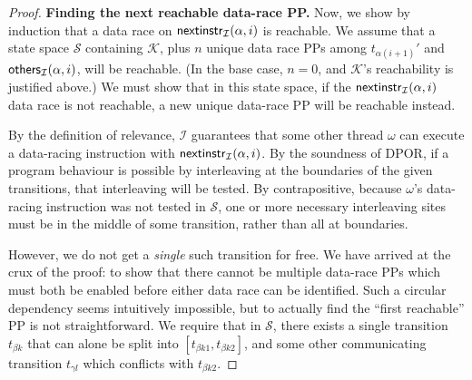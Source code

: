 \begin{proof}
\newcommand\tbk{\ensuremath{t_{\beta{}k}}}
\newcommand\tbka{\ensuremath{t_{\beta{}k1}}}
\newcommand\tbkb{\ensuremath{t_{\beta{}k2}}}
\newcommand\tgl{\ensuremath{t_{\gamma{}l}}}

{\bf Finding the next reachable data-race PP.}
Now, we show by induction that a data race on $\mathsf{nextinstr}_{\mathcal{I}}(\alpha,i)$ is reachable.
We assume that a state space $\mathcal{S}$ containing $\mathcal{K}$,
plus $n$ unique data race PPs among $t_{\alpha{}(i+1)}'$ and $\mathsf{others}_{\mathcal{I}}(\alpha,i)$,
will be reachable.
(In the base case, $n=0$, and $\mathcal{K}$'s reachability is justified above.)
We must show that in this state space, if the $\mathsf{nextinstr}_{\mathcal{I}}(\alpha,i)$ data race is not reachable,
a new unique data-race PP will be reachable instead.

By the definition of relevance, %
$\mathcal{I}$ guarantees that some other thread $\omega$ can execute a data-racing instruction with $\mathsf{nextinstr}_{\mathcal{I}}(\alpha,i)$.
%
By the soundness of DPOR, if a program behaviour is possible by interleaving at the boundaries of
the given transitions, that interleaving will be tested.
By contrapositive,
because $\omega$'s data-racing instruction was not tested in $\mathcal{S}$,
one or more necessary interleaving sites must be in the middle of some transition, rather than all at boundaries.

However, we do not get a {\em single} such transition for free.
We have arrived at the crux of the proof:
to show that there cannot be multiple data-race PPs which must both be enabled before either data race can be identified.
Such a circular dependency seems intuitively impossible, but to actually find the ``first reachable'' PP is not straightforward.
We require that in $\mathcal{S}$, there exists a single transition $\tbk$ that can alone be split into $[\tbka,\tbkb]$,
and some other communicating transition $\tgl$ which conflicts with $\tbkb$.


\end{proof}

